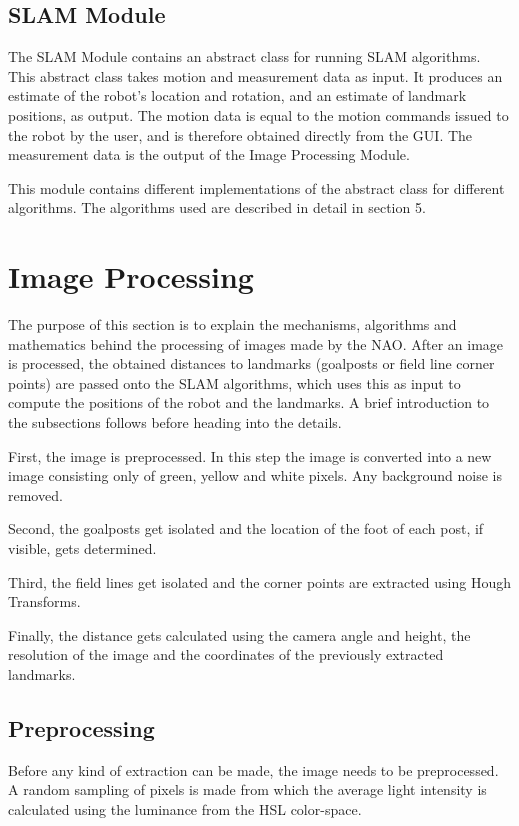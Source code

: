 \documentclass{ba-kecs}
\numberwithin{figure}{section}
\numberwithin{equation}{section}
\begin{document}
\subsection{SLAM Module}
The SLAM Module contains an abstract class for running SLAM algorithms. This abstract class takes motion and measurement data as input. It produces an estimate of the robot's location and rotation, and an estimate of landmark positions, as output. The motion data is equal to the motion commands issued to the robot by the user, and is therefore obtained directly from the GUI. The measurement data is the output of the Image Processing Module.

This module contains different implementations of the abstract class for different algorithms. The algorithms used are described in detail in section 5.






\section{Image Processing}

The purpose of this section is to explain the mechanisms, algorithms and mathematics behind the processing of images made by the NAO.
After an image is processed, the obtained distances to landmarks (goalposts or field line corner points) are passed onto the SLAM algorithms, which uses this as input to compute the positions of the robot and the landmarks.
A brief introduction to the subsections follows before heading into the details.

First, the image is preprocessed. In this step the image is converted into a new image consisting only of green, yellow and white pixels. Any background noise is removed.

Second, the goalposts get isolated and the location of the foot of each post, if visible, gets determined.

Third, the field lines get isolated and the corner points are extracted using Hough Transforms.

Finally, the distance gets calculated using the camera angle and height, the resolution of the image and the coordinates of the previously extracted landmarks.

\subsection{Preprocessing}
Before any kind of extraction can be made, the image needs to be preprocessed. A random sampling of pixels is made from which the average light intensity is calculated using the luminance from the HSL color-space.
\end{document}

